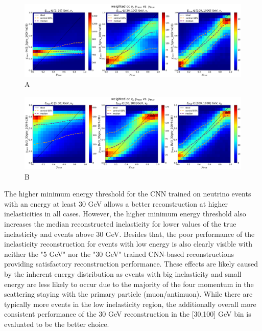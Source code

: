 \documentclass[a4paper,12pt,numbered]{article}
\begin{document}
\newpage

\begin{figure}[H]
\centering
\includegraphics[width=\textwidth]{Graphics/Inelasticity/WithCentral68/weighted/weighted_cc_ytruevsyreco_lvl3_5gev_100rho36_numu.png}
\caption{A}
\end{figure}

\begin{figure}[H]
\centering
\includegraphics[width=\textwidth]{Graphics/Inelasticity/WithCentral68/weighted/weighted_cc_ytruevsyreco_lvl3_30gev_100rho36_numu.png}
\caption{B}
\end{figure}

The higher minimum energy threshold for the CNN trained on neutrino events with an energy at least 30 GeV allows a better reconstruction at higher inelasticities in all cases. However, the higher minimum energy threshold also increases the median reconstructed inelasticity for lower values of the true inelasticity and events above 30 GeV. Besides that, the poor performance of the inelasticity reconstruction for events with low energy is also clearly visible with neither the "5 GeV" nor the "30 GeV" trained CNN-based reconstructions providing satisfactory reconstruction performance. These effects are likely caused by the inherent energy distribution as events with big inelasticity and small energy are less likely to occur due to the majority of the four momentum in the scattering staying with the primary particle (muon/antimuon). While there are typically more events in the low inelasticity region, the additionally overall more consistent performance of the 30 GeV reconstruction in the [30,100] GeV bin is evaluated to be the better choice.
\end{document}
